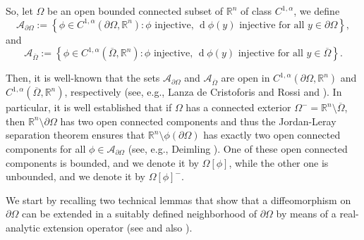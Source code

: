 \documentclass[11pt,reqno,a4paper]{amsart}
\theoremstyle{plain}
\theoremstyle{definition}
\newcommand{\R}{\mathbb{R}}
\renewcommand{\d}[1]{\ensuremath{\operatorname{d}\!{#1}}}
\begin{document}
So, let $\Omega$ be an open bounded connected subset of $\R^n$ of class $C^{1,\alpha}$, we define
\begin{equation*}
    \mathcal{A}_{\partial\Omega} := \left\{ \phi \in C^{1,\alpha}(\partial\Omega,\R^n) : \phi \text{ injective}, \, \d \phi(y) \text{ injective for all } y \in \partial\Omega \right\},    
\end{equation*}
and 
\begin{equation*}
    \mathcal{A}_{\overline{\Omega}} := \left\{ \phi \in C^{1,\alpha}(\overline{\Omega},\R^n) : \phi \text{ injective}, \, \d \phi(y) \text{ injective for all } y \in \overline{\Omega} \right\}.   
\end{equation*}

Then, it is well-known that the sets $\mathcal{A}_{\partial\Omega}$ and $\mathcal{A}_{\overline{\Omega}}$ are open in $C^{1,\alpha}(\partial\Omega,\R^n)$ and $C^{1,\alpha}(\overline{\Omega},\R^n)$,
respectively (see, e.g., Lanza de Cristoforis and Rossi \cite[Lem.\,2.2]{LaRo08}
and \cite[Lem.\,2.5]{LaRo04}). In particular, it is well established that if $\Omega$ has a connected exterior $\Omega^- = \R^n \setminus \overline{\Omega}$, then $\R^n \setminus \partial\Omega$ has two open connected components and thus the Jordan-Leray separation theorem ensures that $\R^n \setminus \phi(\partial\Omega)$ has exactly two open connected components for all $\phi \in \mathcal{A}_{\partial\Omega}$ (see, e.g., Deimling \cite[Thm.\,5.2]{Deimling85}). One of these open connected components is bounded, and we denote it by $\Omega[\phi]$, while the other one is unbounded, and we denote it by $\Omega[\phi]^-$. 

We start by recalling two technical lemmas that show that a diffeomorphism on $\partial\Omega$ can be extended in a suitably defined neighborhood of $\partial\Omega$ by means of a real-analytic extension operator (see \cite[Lems.\,2.2\,\&\,2.3]{DaLu23} and also \cite{LaRo08}).
\end{document}
